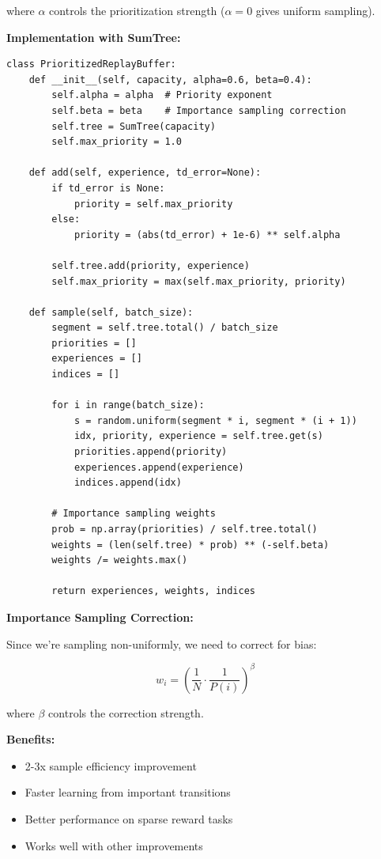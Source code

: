 \documentclass[12pt]{article}
\begin{document}
{{where $\alpha$ controls the prioritization strength ($\alpha = 0$ gives uniform sampling).

\textbf{Implementation with SumTree:}

\begin{verbatim}
class PrioritizedReplayBuffer:
    def __init__(self, capacity, alpha=0.6, beta=0.4):
        self.alpha = alpha  # Priority exponent
        self.beta = beta    # Importance sampling correction
        self.tree = SumTree(capacity)
        self.max_priority = 1.0

    def add(self, experience, td_error=None):
        if td_error is None:
            priority = self.max_priority
        else:
            priority = (abs(td_error) + 1e-6) ** self.alpha
        
        self.tree.add(priority, experience)
        self.max_priority = max(self.max_priority, priority)

    def sample(self, batch_size):
        segment = self.tree.total() / batch_size
        priorities = []
        experiences = []
        indices = []

        for i in range(batch_size):
            s = random.uniform(segment * i, segment * (i + 1))
            idx, priority, experience = self.tree.get(s)
            priorities.append(priority)
            experiences.append(experience)
            indices.append(idx)

        # Importance sampling weights
        prob = np.array(priorities) / self.tree.total()
        weights = (len(self.tree) * prob) ** (-self.beta)
        weights /= weights.max()

        return experiences, weights, indices
\end{verbatim}

\textbf{Importance Sampling Correction:}

Since we're sampling non-uniformly, we need to correct for bias:

\begin{equation}
w_i = \left(\frac{1}{N} \cdot \frac{1}{P(i)}\right)^\beta
\end{equation}

where $\beta$ controls the correction strength.

\textbf{Benefits:}
\begin{itemize}
\item 2-3x sample efficiency improvement
\item Faster learning from important transitions
\item Better performance on sparse reward tasks
\item Works well with other improvements
\end{itemize}

}}
\end{document}
